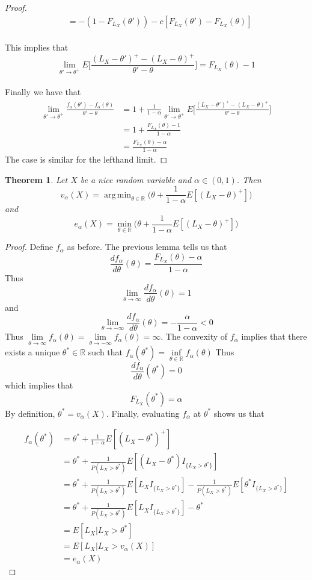 \documentclass[12pt]{amsart}
\newtheorem{thm}{Theorem}[section]
\newcommand{\al}{\alpha}
\newcommand{\R}{\mathbb{R}}
\DeclareMathOperator*{\argmin}{arg\,min}
\begin{document}
\begin{proof}
\begin{align*}
&= -(1-F_{L_X}(\theta')) -c[F_{L_X}(\theta') - F_{L_X}(\theta)]
\end{align*}\\
This implies that $$\lim_{\theta' \rightarrow \theta^+}E\bigg[ \frac{(L_X - \theta')^+ - (L_X - \theta)^+}{\theta'-\theta} \bigg] = F_{L_X}(\theta) -1$$\\
Finally we have that 
\begin{align*}
\lim_{\theta' \rightarrow \theta^+} \frac{f_\al(\theta') - f_\al(\theta)}{\theta' - \theta} 
&= 1 + \frac{1}{1-\al}\lim_{\theta' \rightarrow \theta^+}E\bigg[ \frac{(L_X - \theta')^+ - (L_X - \theta)^+}{\theta'-\theta} \bigg] \\
&= 1 + \frac{F_{L_X}(\theta) -1}{1-\al}\\
&= \frac{F_{L_X}(\theta) -\al}{1-\al}
\end{align*}
The case is similar for the lefthand limit.

\end{proof}

\begin{thm}
Let $X$ be a nice random variable and $\al\in (0,1)$. Then $$v_{\al}(X) = \argmin_{\theta \in \R} \bigg(\theta + \frac{1}{1-\al}E[(L_X - \theta)^+]\bigg)$$ and $$e_{\al}(X) = \min_{\theta \in \R} \bigg(\theta + \frac{1}{1-\al}E[(L_X - \theta)^+]\bigg)$$
\end{thm}

\begin{proof} 
Define $f_{\alpha}$ as before. The previous lemma tells us that $$\frac{d f_{\al}}{d \theta}(\theta) = \frac{F_{L_X}(\theta) -\al}{1-\al} $$ Thus $$\lim_{\theta \rightarrow \infty}\frac{d f_{\al}}{d \theta}(\theta) = 1$$ and $$\lim_{\theta \rightarrow -\infty} \frac{d f_{\al}}{d \theta}(\theta) = - \frac{\al}{1-\al} <0$$
Thus $\lim\limits_{\theta \rightarrow \infty} f_{\alpha}(\theta) = \lim\limits_{\theta \rightarrow -\infty}f_{\al}(\theta) = \infty$. The convexity of $f_{\al}$ implies that there exists a unique $\theta^* \in \R$ such that $f_{\al}(\theta^*) = \inf\limits_{\theta \in \R}f_{\al}(\theta)$
Thus $$\frac{d f_{\al}}{d \theta}(\theta^*) = 0$$
which implies that $$F_{L_X}(\theta^*) = \al$$
By definition, $\theta^* = v_{\al}(X)$. Finally, evaluating $f_{\al}$ at $\theta^*$ shows us that 

\begin{align*}
f_{\al}(\theta^*)  
&=  \theta^* + \frac{1}{1- \al}E[(L_X - \theta^*)^+]\\
& = \theta^* + \frac{1}{P(L_X>\theta^*)}E[(L_X-\theta^*)I_{\{L_X>\theta^*\}}] \\
& = \theta^* + \frac{1}{P(L_X>\theta^*)}E[L_XI_{\{L_X>\theta^*\}}] - \frac{1}{P(L_X>\theta^*)}E[\theta^*I_{\{L_X>\theta^*\}}] \\
& = \theta^* + \frac{1}{P(L_X>\theta^*)}E[L_XI_{\{L_X>\theta^*\}}] - \theta^* \\
&= E[L_X|L_X> \theta^*] \\
& = E[L_X|L_X>v_{\al}(X)] \\
& = e_{\al}(X)
\end{align*}

\end{proof}
\end{document}
